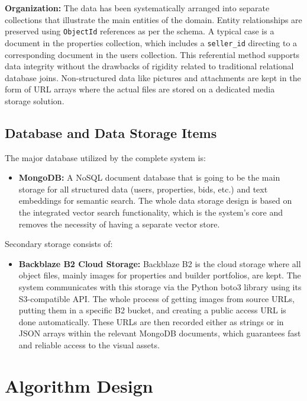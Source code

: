 \textbf{Organization:} The data has been systematically arranged into separate collections that illustrate the main entities of the domain. Entity relationships are preserved using \texttt{ObjectId} references as per the schema. A typical case is a document in the properties collection, which includes a \texttt{seller\_id} directing to a corresponding document in the users collection. This referential method supports data integrity without the drawbacks of rigidity related to traditional relational database joins. Non-structured data like pictures and attachments are kept in the form of URL arrays where the actual files are stored on a dedicated media storage solution.

\subsection{Database and Data Storage Items}

The major database utilized by the complete system is:

\begin{itemize}
    \item \textbf{MongoDB:} A NoSQL document database that is going to be the main storage for all structured data (users, properties, bids, etc.) and text embeddings for semantic search. The whole data storage design is based on the integrated vector search functionality, which is the system's core and removes the necessity of having a separate vector store.
\end{itemize}

Secondary storage consists of:

\begin{itemize}
    \item \textbf{Backblaze B2 Cloud Storage:} Backblaze B2 is the cloud storage where all object files, mainly images for properties and builder portfolios, are kept. The system communicates with this storage via the Python boto3 library using its S3-compatible API. The whole process of getting images from source URLs, putting them in a specific B2 bucket, and creating a public access URL is done automatically. These URLs are then recorded either as strings or in JSON arrays within the relevant MongoDB documents, which guarantees fast and reliable access to the visual assets.
\end{itemize}

\section{Algorithm Design}

